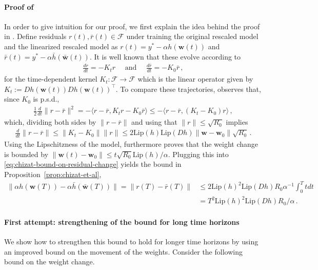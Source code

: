\documentclass[11pt]{article} %
\newcommand{\<}{\langle}
\renewcommand{\>}{\rangle}
\def\bw{{\boldsymbol w}}
\def\cF{{\mathcal F}}
\def\cF{{\mathcal F}}
\def\barh{\bar{h}}
\def\barbw{\bar{\bw}}
\newcommand{\Lip}{\mathrm{Lip}}
\theoremstyle{plain}
\theoremstyle{definition}
\theoremstyle{remark}
\begin{document}
\paragraph{Proof of \cite{chizat2019lazy}} In order to give intuition for our proof, we first explain the idea behind the proof in \cite{chizat2019lazy}. Define residuals $r(t), \bar{r}(t) \in \cF$ under training the original rescaled model and the linearized rescaled model as $r(t) = y^* - \alpha h(\bw(t))$ and $\bar{r}(t) = y^* - \alpha \barh(\barbw(t))$. It is well known that these evolve according to
\begin{align*}
\frac{dr}{dt} = -K_t r \quad \mbox{ and } \quad \frac{d\bar{r}}{dt} = -K_0 \bar{r}\,,
\end{align*}
for the time-dependent kernel $K_t : \cF \to \cF$ which is the linear operator given by $K_t := Dh(\bw(t)) Dh(\bw(t))^{\top}$. To compare these trajectories, \cite{chizat2019lazy} observes that, since $K_0$ is p.s.d.,
\begin{align*}
\frac{1}{2} \frac{d}{dt} \|r - \bar{r}\|^2 = -\<r - \bar{r}, K_t r - K_0 \bar{r}\> \leq -\<r - \bar{r}, (K_t - K_0) r\>\,,
\end{align*}
which, dividing both sides by $\|r - \bar{r}\|$ and using that $\|r\| \leq \sqrt{R_0}$ implies 
\begin{align}\label{eq:chizat-bound-on-residual-change}
\frac{d}{dt} \|r - \bar{r}\| \leq \|K_t - K_0\|\|r\| \leq 2\Lip(h) \Lip(Dh) \|\bw - \bw_0\| \sqrt{R_0}\,.
\end{align}
Using the Lipschitzness of the model, \cite{chizat2019lazy} furthermore proves that the weight change is bounded by $\|\bw(t) - \bw_0\| \leq t \sqrt{R_0} \Lip(h) / \alpha$. Plugging this into \eqref{eq:chizat-bound-on-residual-change} yields the bound in Proposition~\ref{prop:chizat-et-al},
\begin{align*}
\|\alpha h(\bw(T)) - \alpha \barh(\barbw(T))\| = \|r(T) - \bar{r}(T)\| &\leq 2\Lip(h)^2\Lip(Dh)R_0 \alpha^{-1} \int_{0}^T t  dt \\
&= T^2 \Lip(h)^2 \Lip(Dh) R_0 / \alpha\,.
\end{align*}

\paragraph{First attempt: strengthening of the bound for long time horizons} We show how to strengthen this bound to hold for longer time horizons by using an improved bound on the movement of the weights. Consider the following bound on the weight change.
\end{document}
